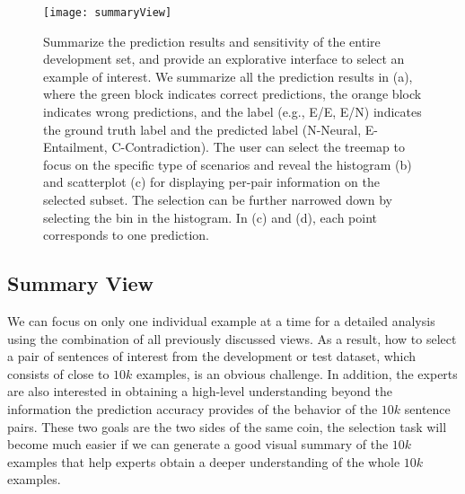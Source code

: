 \begin{figure}[htbp]
\centering
\vspace{-2mm}
 \texttt{[image: summaryView]}
 \vspace{-6mm}
 \caption{
Summarize the prediction results and sensitivity of the entire development set, and provide an explorative interface to select an example of interest.
We summarize all the prediction results in (a), where the green block indicates correct predictions, the orange block indicates wrong predictions, and the label (e.g., E/E, E/N) indicates the ground truth label and the predicted label (N-Neural, E-Entailment, C-Contradiction).
%
The user can select the treemap to focus on the specific type of scenarios and reveal the histogram (b) and scatterplot (c) for displaying per-pair information on the selected subset.
The selection can be further narrowed down by selecting the bin in the histogram.
In (c) and (d), each point corresponds to one prediction.
 }
 \vspace{-2mm}
\label{fig:summaryView}
\end{figure}

\subsection{Summary View}
\label{sec:allPairs}
We can focus on only one individual example at a time for a detailed analysis using the combination of all previously discussed views. As a result, how to select a pair of sentences of interest from the development or test dataset, which consists of close to $10k$ examples, is an obvious challenge.
In addition, the experts are also interested in obtaining a high-level understanding beyond the information the prediction accuracy provides of the behavior of the $10k$ sentence pairs.
%
These two goals are the two sides of the same coin, the selection task will become much easier if we can generate a good visual summary of the $10k$ examples that help experts obtain a deeper understanding of the whole $10k$ examples.

